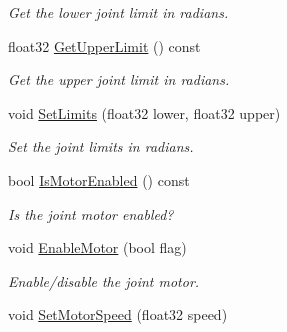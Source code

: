 \begin{DoxyCompactItemize}
\begin{DoxyCompactList}\small\item\em Get the lower joint limit in radians. \end{DoxyCompactList}\item 
\hypertarget{classb2_revolute_joint_a9bb683118879611e84e4cb26bdc8d39f}{float32 \hyperlink{classb2_revolute_joint_a9bb683118879611e84e4cb26bdc8d39f}{Get\-Upper\-Limit} () const }\label{classb2_revolute_joint_a9bb683118879611e84e4cb26bdc8d39f}

\begin{DoxyCompactList}\small\item\em Get the upper joint limit in radians. \end{DoxyCompactList}\item 
\hypertarget{classb2_revolute_joint_a32f9393d8a6b993fd523f0f643c28107}{void \hyperlink{classb2_revolute_joint_a32f9393d8a6b993fd523f0f643c28107}{Set\-Limits} (float32 lower, float32 upper)}\label{classb2_revolute_joint_a32f9393d8a6b993fd523f0f643c28107}

\begin{DoxyCompactList}\small\item\em Set the joint limits in radians. \end{DoxyCompactList}\item 
\hypertarget{classb2_revolute_joint_a9477b305db080e17dce8f2c6da0babb0}{bool \hyperlink{classb2_revolute_joint_a9477b305db080e17dce8f2c6da0babb0}{Is\-Motor\-Enabled} () const }\label{classb2_revolute_joint_a9477b305db080e17dce8f2c6da0babb0}

\begin{DoxyCompactList}\small\item\em Is the joint motor enabled? \end{DoxyCompactList}\item 
\hypertarget{classb2_revolute_joint_a80ed5a07d9a0e07d010808a73ffae6ff}{void \hyperlink{classb2_revolute_joint_a80ed5a07d9a0e07d010808a73ffae6ff}{Enable\-Motor} (bool flag)}\label{classb2_revolute_joint_a80ed5a07d9a0e07d010808a73ffae6ff}

\begin{DoxyCompactList}\small\item\em Enable/disable the joint motor. \end{DoxyCompactList}\item 
\hypertarget{classb2_revolute_joint_a56f60bb1ea69048c8a455da49d62bf65}{void \hyperlink{classb2_revolute_joint_a56f60bb1ea69048c8a455da49d62bf65}{Set\-Motor\-Speed} (float32 speed)}\label{classb2_revolute_joint_a56f60bb1ea69048c8a455da49d62bf65}


\end{DoxyCompactItemize}
